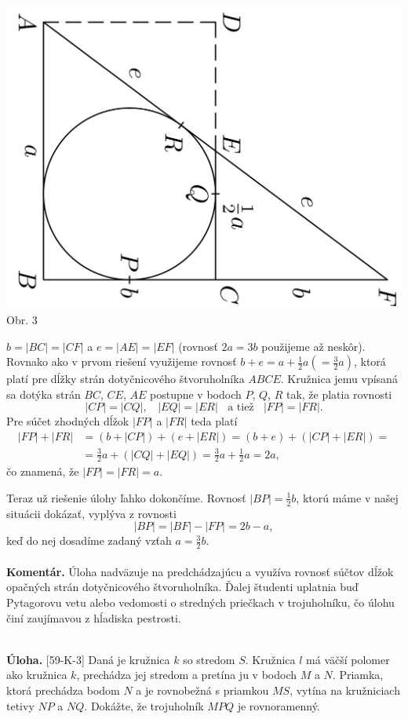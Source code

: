 \documentclass[11pt,a4paper,oneside,final]{book}
\newcommand{\kom}{\textbf{Komentár.} }
\newcommand{\ul}{\textbf{Úloha.} }
\begin{document}
\begin{center}
\includegraphics{61K32}\\

Obr. 3
\end{center}
$b = |BC| = |CF|$ a $e = |AE| = |EF|$ (rovnosť $2a = 3b$ použijeme až neskôr). Rovnako ako v prvom riešení využijeme rovnosť $b+e = a+\frac{1}{2}a (=\frac{3}{2}a)$, ktorá platí pre dĺžky strán dotyčnicového štvoruholníka $ABCE$. Kružnica jemu vpísaná sa dotýka strán $BC$, $CE$, $AE$ postupne v bodoch $P$, $Q$, $R$ tak, že platia rovnosti
$$|CP| = |CQ|, \ \ \ \ |EQ| = |ER| \ \ \ \ \text{a tiež}\ \ \ \ |FP| = |FR|.$$
Pre súčet zhodných dĺžok $|FP|$ a $|FR|$ teda platí
\begin{align*}
|FP| + |FR| &= (b + |CP|) + (e + |ER|) = (b + e) + (|CP| + |ER|) =\\
&=\frac{3}{2}a + (|CQ| + |EQ|) = \frac{3}{2}a + \frac{1}{2}a = 2a,
\end{align*}
čo znamená, že $|FP| = |FR| = a$.

Teraz už riešenie úlohy ľahko dokončíme. Rovnosť $|BP| =\frac{1}{2}b$, ktorú máme v našej situácii dokázať, vyplýva z rovnosti
$$|BP| = |BF| - |FP| = 2b -a,$$
keď do nej dosadíme zadaný vzťah $a=\frac{3}{2}b$.\\
\\
\kom Úloha nadväzuje na predchádzajúcu a využíva rovnosť súčtov dĺžok opačných strán dotyčnicového štvoruholníka. Ďalej študenti uplatnia buď Pytagorovu vetu alebo vedomosti o stredných priečkach v trojuholníku, čo úlohu činí zaujímavou z hĺadiska pestrosti.\\
\\
\begin{tcolorbox}[breakable,notitle,boxrule=0pt,colback=light-gray,colframe=light-gray]\ul [59-K-3]  Daná je kružnica $k$ so stredom $S$. Kružnica $l$ má väčší polomer ako kružnica $k$, prechádza jej stredom a pretína ju v bodoch $M$ a $N$. Priamka, ktorá prechádza bodom $N$ a je rovnobežná s priamkou $MS$, vytína na kružniciach tetivy $NP$ a $NQ$. Dokážte, že trojuholník $MPQ$ je rovnoramenný.

\end{tcolorbox}
\end{document}
